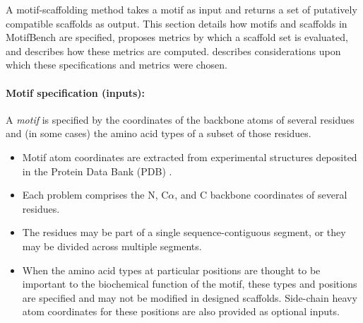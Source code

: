 


A motif-scaffolding method
takes a motif as input and returns a set of putatively compatible scaffolds as output.
This section details how motifs and scaffolds in MotifBench are specified,
proposes metrics by which a scaffold set is evaluated,
and describes how these metrics are computed.
 describes considerations upon which these specifications and metrics were chosen.



\paragraph{Motif specification (inputs):}
A \emph{motif} is specified by the coordinates of the backbone atoms of several residues and (in some cases) the amino acid types of a subset of those residues.
\begin{itemize}
    \item {Motif atom coordinates are extracted from experimental structures deposited in the Protein Data Bank (PDB) \citep{berman2002protein}.}
    \item {Each problem comprises the N, C$\alpha$, and C backbone coordinates of several residues.}
    \item {The residues may be part of a single sequence-contiguous segment, or they may be divided across multiple segments.}
    \item {When the amino acid types at particular positions are thought to be important to the biochemical function of the motif, these types and positions are specified and may not be modified in designed scaffolds.  Side-chain heavy atom coordinates for these positions are also provided as optional inputs.}
\end{itemize}

